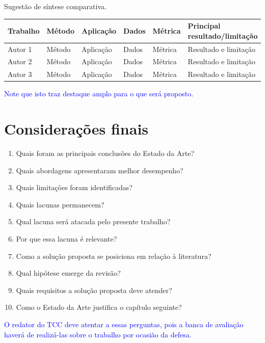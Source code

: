 Sugestão de síntese comparativa.

\begin{center}
	\begin{tabular}{p{2.5cm}p{2cm}p{2cm}p{2cm}p{2cm}p{3cm}}
		\toprule
		\textbf{Trabalho} &
		\textbf{Método} &
		\textbf{Aplicação} &
		\textbf{Dados} &
		\textbf{Métrica} &
		\textbf{Principal resultado/limitação} \\
		\midrule
		Autor 1 & Método & Aplicação & Dados & Métrica & Resultado e limitação \\
		Autor 2 & Método & Aplicação & Dados & Métrica & Resultado e limitação \\
		Autor 3 & Método & Aplicação & Dados & Métrica & Resultado e limitação \\
		\bottomrule
	\end{tabular}
\end{center}

\textcolor{blue}{Note que isto traz destaque amplo para o que será proposto.}
\section{Considerações finais}

\begin{enumerate}
	\item Quais foram as principais conclusões do Estado da Arte?
	\item Quais abordagens apresentaram melhor desempenho?
	\item Quais limitações foram identificadas?
	\item Quais lacunas permanecem?
	\item Qual lacuna será atacada pelo presente trabalho?
	\item Por que essa lacuna é relevante?
	\item Como a solução proposta se posiciona em relação à literatura?
	\item Qual hipótese emerge da revisão?
	\item Quais requisitos a solução proposta deve atender?
	\item Como o Estado da Arte justifica o capítulo seguinte?
\end{enumerate}

\textcolor{blue}{O redator do TCC deve atentar a essas perguntas, pois a banca de avaliação haverá de realizá-las sobre o trabalho por ocasião da defesa.}
